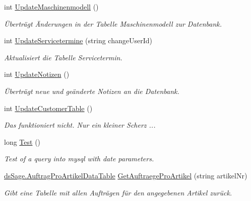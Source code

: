 \begin{DoxyCompactItemize}
int \hyperlink{class_products_1_1_data_1_1_data_service_abde2d236fc0f7c33ef9dd4c96de540c3}{Update\+Maschinenmodell} ()
\begin{DoxyCompactList}\small\item\em Überträgt Änderungen in der Tabelle Maschinenmodell zur Datenbank. \end{DoxyCompactList}\item 
int \hyperlink{class_products_1_1_data_1_1_data_service_a75f556e7eb310d1bc7e2a3f60ac4fa26}{Update\+Servicetermine} (string change\+User\+Id)
\begin{DoxyCompactList}\small\item\em Aktualisiert die Tabelle Servicetermin. \end{DoxyCompactList}\item 
int \hyperlink{class_products_1_1_data_1_1_data_service_a825111cf9ecaa7630b4d0ecc0076d7b4}{Update\+Notizen} ()
\begin{DoxyCompactList}\small\item\em Überträgt neue und geänderte Notizen an die Datenbank. \end{DoxyCompactList}\item 
int \hyperlink{class_products_1_1_data_1_1_data_service_af041031391da40dddb6d446e2c516af1}{Update\+Customer\+Table} ()
\begin{DoxyCompactList}\small\item\em Das funktioniert nicht. Nur ein kleiner Scherz ... \end{DoxyCompactList}\item 
long \hyperlink{class_products_1_1_data_1_1_data_service_a1a7c56413ff398cfe26606810d5471be}{Test} ()
\begin{DoxyCompactList}\small\item\em Test of a query into mysql with date parameters. \end{DoxyCompactList}\item 
\hyperlink{class_products_1_1_data_1_1ds_sage_1_1_auftrag_pro_artikel_data_table}{ds\+Sage.\+Auftrag\+Pro\+Artikel\+Data\+Table} \hyperlink{class_products_1_1_data_1_1_data_service_a41ccc05965c4eb6508c146e505bde0e3}{Get\+Auftraege\+Pro\+Artikel} (string artikel\+Nr)
\begin{DoxyCompactList}\small\item\em Gibt eine Tabelle mit allen Aufträgen für den angegebenen Artikel zurück. \end{DoxyCompactList}\end{DoxyCompactItemize}
